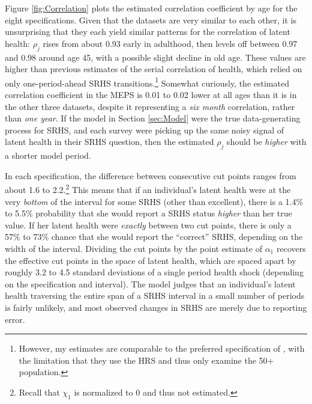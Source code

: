 \documentclass[12pt,pdftex,letterpaper]{article}
\newcommand{\Age}{j}
\newcommand{\Corr}{\rho}
\newcommand{\Cut}{\chi}
\newcommand{\LatentParam}{\alpha}
\begin{document}
Figure \ref{fig:Correlation} plots the estimated correlation coefficient by age for the eight specifications.  Given that the datasets are very similar to each other, it is unsurprising that they each yield similar patterns for the correlation of latent health: $\Corr_\Age$ rises from about 0.93 early in adulthood, then levels off between 0.97 and 0.98 around age 45, with a possible slight decline in old age.  These values are higher than previous estimates of the serial correlation of health, which relied on only one-period-ahead SRHS transitions.\footnote{However, my estimates are comparable to the preferred specification of \cite{Lange12}, with the limitation that they use the HRS and thus only examine the 50+ population.}  Somewhat curiously, the estimated correlation coefficient in the MEPS is 0.01 to 0.02 lower at all ages than it is in the other three datasets, despite it representing a \textit{six month} correlation, rather than \textit{one year}.  If the model in Section \ref{sec:Model} were the true data-generating process for SRHS, and each survey were picking up the same noisy signal of latent health in their SRHS question, then the estimated $\Corr_j$ should be \textit{higher} with a shorter model period.

In each specification, the difference between consecutive cut points ranges from about 1.6 to 2.2.\footnote{Recall that $\Cut_1$ is normalized to 0 and thus not estimated.}  This means that if an individual's latent health were at the very \textit{bottom} of the interval for some SRHS (other than excellent), there is a 1.4\% to 5.5\% probability that she would report a SRHS status \textit{higher} than her true value.  If her latent health were \textit{exactly} between two cut points, there is only a 57\% to 73\% chance that she would report the ``correct'' SRHS, depending on the width of the interval.  Dividing the cut points by the point estimate of $\LatentParam_1$ recovers the effective cut points in the space of latent health, which are spaced apart by roughly 3.2 to 4.5 standard deviations of a single period health shock (depending on the specification and interval).  The model judges that an individual's latent health traversing the entire span of a SRHS interval in a small number of periods is fairly unlikely, and most observed changes in SRHS are merely due to reporting error.
\end{document}
